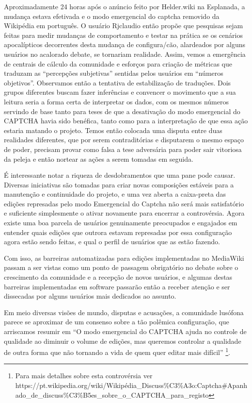 Aproximadamente 24 horas após o anúncio feito por Helder.wiki na Esplanada, a mudança estava efetivada e o modo emergencial do captcha removido da Wikipédia em português. O usuário Rjclaudio então propõe que pesquisas sejam feitas para medir mudanças de comportamento e testar na prática se os cenários apocalípticos decorrentes desta mudança de configura/cão, alardeados por alguns usuários no acalorado debate, se tornariam realidade. Assim, vemos a emergência de centrais de cálculo da comunidade e esforços para criação de métricas que traduzam as “percepções subjetivas” sentidas pelos usuários em “números objetivos”. Observamos então a tentativa de estabilização de traduções. Dois grupos diferentes buscam fazer inferências e convencer o movimento que a sua leitura seria a forma certa de interpretar os dados, com os mesmos números servindo de base tanto para teses de que a desativação do modo emergencial do CAPTCHA havia sido benéfica, tanto como para a interpretação de que essa ação estaria matando o projeto. Temos então colocada uma disputa entre duas realidades diferentes, que por serem contraditórias e disputarem o mesmo espaço de poder, precisam provar como falsa a tese adversária para poder sair vitoriosa da peleja e então nortear as ações a serem tomadas em seguida.

É interessante notar a riqueza de desdobramentos que uma pane pode causar. Diversas iniciativas são tomadas para criar novas composições estáveis para a manutenção e continuidade do projeto, e uma vez aberta a caixa-preta das edições represadas pelo modo Emergencial do Captcha não será mais satisfatório e suficiente simplesmente o ativar novamente para encerrar a controvérsia. Agora existe uma boa parcela de usuários genuinamente preocupados e engajados em entender quais edições que outrora estavam represadas por essa configuração agora estão sendo feitas, e qual o perfil de usuários que as estão fazendo. 

Com isso, as barreiras automatizadas para edições implementadas no MediaWiki passam a ser vistas como um ponto de passagem obrigatório no debate sobre o crescimento da comunidade e a recepção de novos usuários, e algumas destas barreiras implementadas em software passarão então a receber atenção e ser dissecadas por alguns usuários mais dedicados ao assunto.


Em meio diversas visões de mundo, disputas e acusações, a comunidade lusófona parece se aproximar de um consenso sobre a tão polêmica configuração, que arriscamos resumir em ``O modo emergencial do CAPTCHA ajuda no controle de qualidade ao diminuir o volume de edições, mas queremos controlar a qualidade de outra forma que não tornando a vida de quem quer editar mais difícil'' \footnote{Para mais detalhes sobre esta controvérsia ver https://pt.wikipedia.org/wiki/Wikipédia\_Discuss\%C3\%A3o:Captcha\#Apanhado\_de\_discuss\%C3\%B5es\_sobre\_o\_CAPTCHA\_para\_registo}. 

